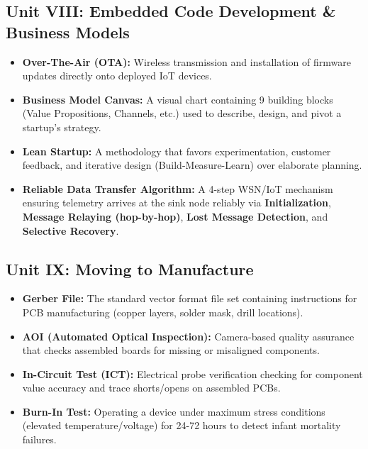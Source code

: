 \subsection{Unit VIII: Embedded Code Development \& Business Models}
\begin{itemize}
  \item   \textbf{Over-The-Air (OTA):} Wireless transmission and installation of firmware updates directly onto deployed IoT devices.
  \item   \textbf{Business Model Canvas:} A visual chart containing 9 building blocks (Value Propositions, Channels, etc.) used to describe, design, and pivot a startup's strategy.
  \item   \textbf{Lean Startup:} A methodology that favors experimentation, customer feedback, and iterative design (Build-Measure-Learn) over elaborate planning.
  \item   \textbf{Reliable Data Transfer Algorithm:} A 4-step WSN/IoT mechanism ensuring telemetry arrives at the sink node reliably via \textbf{Initialization}, \textbf{Message Relaying (hop-by-hop)}, \textbf{Lost Message Detection}, and \textbf{Selective Recovery}.
\end{itemize}


\subsection{Unit IX: Moving to Manufacture}
\begin{itemize}
  \item   \textbf{Gerber File:} The standard vector format file set containing instructions for PCB manufacturing (copper layers, solder mask, drill locations).
  \item   \textbf{AOI (Automated Optical Inspection):} Camera-based quality assurance that checks assembled boards for missing or misaligned components.
  \item   \textbf{In-Circuit Test (ICT):} Electrical probe verification checking for component value accuracy and trace shorts/opens on assembled PCBs.
  \item   \textbf{Burn-In Test:} Operating a device under maximum stress conditions (elevated temperature/voltage) for 24-72 hours to detect infant mortality failures.
\end{itemize}


